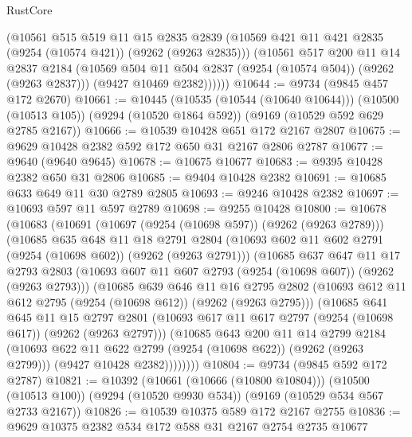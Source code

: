 \begin{lexlean}{RustCore}
\begin{coremodule}
          (@10561
            @515
            @519
            @11
            @15
            @2835
            @2839
            (@10569 @421 @11 @421 @2835 (@9254 (@10574 @421)) (@9262 (@9263 @2835)))
            (@10561
              @517
              @200
              @11
              @14
              @2837
              @2184
              (@10569 @504 @11 @504 @2837 (@9254 (@10574 @504)) (@9262 (@9263 @2837)))
              (@9427 @10469 @2382))))))
@10644 := @9734 (@9845 @457 @172 @2670)
@10661 := @10445
    (@10535 (@10544 (@10640 @10644)))
    (@10500 (@10513 @105))
    (@9294 (@10520 @1864 @592))
    (@9169 (@10529 @592 @629 @2785 @2167))
@10666 := @10539 @10428 @651 @172 @2167 @2807
@10675 := @9629 @10428 @2382 @592 @172 @650 @31 @2167 @2806 @2787
@10677 := @9640 (@9640 @9645)
@10678 := @10675 @10677
@10683 := @9395 @10428 @2382 @650 @31 @2806
@10685 := @9404 @10428 @2382
@10691 := @10685 @633 @649 @11 @30 @2789 @2805
@10693 := @9246 @10428 @2382
@10697 := @10693 @597 @11 @597 @2789
@10698 := @9255 @10428
@10800 := @10678
    (@10683
      (@10691
        (@10697 (@9254 (@10698 @597)) (@9262 (@9263 @2789)))
        (@10685
          @635
          @648
          @11
          @18
          @2791
          @2804
          (@10693 @602 @11 @602 @2791 (@9254 (@10698 @602)) (@9262 (@9263 @2791)))
          (@10685
            @637
            @647
            @11
            @17
            @2793
            @2803
            (@10693 @607 @11 @607 @2793 (@9254 (@10698 @607)) (@9262 (@9263 @2793)))
            (@10685
              @639
              @646
              @11
              @16
              @2795
              @2802
              (@10693 @612 @11 @612 @2795 (@9254 (@10698 @612)) (@9262 (@9263 @2795)))
              (@10685
                @641
                @645
                @11
                @15
                @2797
                @2801
                (@10693 @617 @11 @617 @2797 (@9254 (@10698 @617)) (@9262 (@9263 @2797)))
                (@10685
                  @643
                  @200
                  @11
                  @14
                  @2799
                  @2184
                  (@10693 @622 @11 @622 @2799 (@9254 (@10698 @622)) (@9262 (@9263 @2799)))
                  (@9427 @10428 @2382))))))))
@10804 := @9734 (@9845 @592 @172 @2787)
@10821 := @10392
    (@10661 (@10666 (@10800 @10804)))
    (@10500 (@10513 @100))
    (@9294 (@10520 @9930 @534))
    (@9169 (@10529 @534 @567 @2733 @2167))
@10826 := @10539 @10375 @589 @172 @2167 @2755
@10836 := @9629 @10375 @2382 @534 @172 @588 @31 @2167 @2754 @2735 @10677

\end{coremodule}
\end{lexlean}
